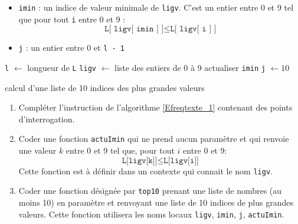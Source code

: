 \begin{enumerate}
\begin{itemize}
  \item \texttt{imin} : un indice de valeur minimale de \texttt{ligv}. C'est un entier entre 0 et 9 tel que pour tout \texttt{i} entre 0 et 9 :
  \begin{displaymath}
  \texttt{L[ ligv[ imin ] ]} \leq  \texttt{L[ ligv[ i ] ]}
  \end{displaymath}
  \item \texttt{j} : un entier entre 0 et \texttt{l - 1}
\end{itemize}
\begin{algorithm}
  \texttt{l} $\leftarrow$ longueur de \texttt{L}\;
  \texttt{ligv} $\leftarrow$ liste des entiers de 0 à 9\;
  actualiser  \texttt{imin}\;
  \texttt{j} $\leftarrow 10$\;
  \caption{calcul d'une liste de 10 indices des plus grandes valeurs}
  \label{Efreqtexte_1}
\end{algorithm}
\begin{enumerate}
  \item Compléter l'instruction de l'algorithme \ref{Efreqtexte_1} contenant des points d'interrogation.
  \item Coder une fonction \texttt{actuImin} qui ne prend aucun paramètre et qui renvoie une valeur  $k$ entre 0 et 9 tel que, pour tout $i$ entre 0 et 9:
\begin{displaymath}
  \texttt{L[ligv[k]]} \leq \texttt{L[ligv[i]]} 
\end{displaymath}
Cette fonction est à définir dans un contexte qui connait le nom \texttt{ligv}.
  \item Coder une fonction désignée par \texttt{top10} prenant une liste de nombres (au moins 10) en paramètre et renvoyant une liste de 10 indices de plus grandes valeurs. Cette fonction utilisera les noms locaux \texttt{ligv}, \texttt{imin}, \texttt{j}, \texttt{actuImin}.
\end{enumerate}
\end{enumerate}


